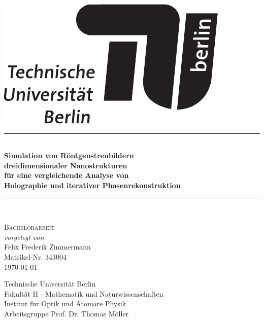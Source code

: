 \begin{titlepage}
		
	\begin{center}
				
				
		\begin{flushright}
			\includegraphics[width=.3\textwidth]{images/TU_Logo.pdf}\\[2.5cm]    
			\end{flushright}
					
					
			{\newcommand{\HRule}{\rule{\linewidth}{0.5mm}}
				\HRule \\[0.4cm]
				\LARGE{\bfseries Simulation von Röntgenstreubildern\\ dreidimensionaler Nanostrukturen\\ für eine vergleichende Analyse von\\ Holographie und iterativer Phasenrekonstruktion}\\
							
				\HRule \\[1.5cm]}
			\textsc{\Large Bachelorarbeit}\\[0.5cm]
					
			\emph{vorgelegt von}\\
			Felix Frederik Zimmermann\\
			Matrikel-Nr. 343004\\[0.5cm]
			{\large \today}
					
					
			\vfill
					
			Technische Universität Berlin\\
			Fakultät II - Mathematik und Naturwissenschaften\\
			Institut für Optik und Atomare Physik\\
			Arbeitsgruppe Prof. Dr. Thomas Möller\\
					
		\end{center}
			
	\end{titlepage}